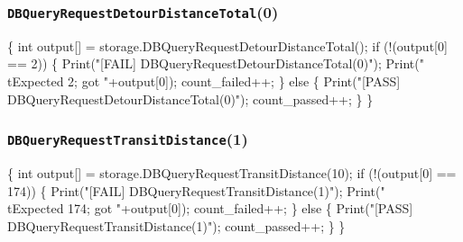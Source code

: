 \documentclass{article}
\def\nwendcode{\endtrivlist \endgroup}
\let\nwdocspar=\par
\theoremstyle{definition}
\begin{document}
\subsubsection{{\tt{}DBQueryRequestDetourDistanceTotal}(0)}
\nwenddocs{}\endmoddef{}
\{
  int output[] = storage.DBQueryRequestDetourDistanceTotal();
  if (!(output[0] == 2)) \{
    Print("[FAIL] DBQueryRequestDetourDistanceTotal(0)");
    Print("\\tExpected 2; got "+output[0]);
    count_failed++;
  \} else \{
    Print("[PASS] DBQueryRequestDetourDistanceTotal(0)");
    count_passed++;
  \}
\}
\nwendcode{}\nwdocspar
\subsubsection{{\tt{}DBQueryRequestTransitDistance}(1)}
\nwenddocs{}\endmoddef{}
\{
  int output[] = storage.DBQueryRequestTransitDistance(10);
  if (!(output[0] == 174)) \{
    Print("[FAIL] DBQueryRequestTransitDistance(1)");
    Print("\\tExpected 174; got "+output[0]);
    count_failed++;
  \} else \{
    Print("[PASS] DBQueryRequestTransitDistance(1)");
    count_passed++;
  \}
\}
\nwendcode{}\nwdocspar
\end{document}
